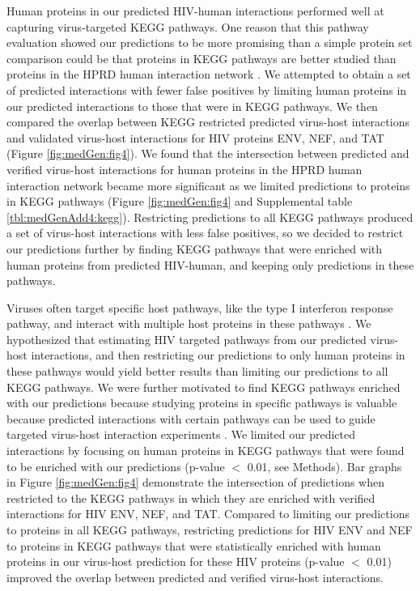 

Human proteins in our predicted HIV-human interactions performed well
at capturing virus-targeted KEGG pathways. One reason that this
pathway evaluation showed our predictions to be more promising than a
simple protein set comparison could be that proteins in KEGG pathways
are better studied than proteins in the HPRD human interaction network
\cite{kanehisa08}. We attempted to obtain a set of predicted
interactions with fewer false positives by limiting human proteins in
our predicted interactions to those that were in KEGG pathways. We
then compared the overlap between KEGG restricted predicted virus-host
interactions and validated virus-host interactions for HIV proteins
ENV, NEF, and TAT (Figure \ref{fig:medGen:fig4}). We found that the
intersection between predicted and verified virus-host interactions
for human proteins in the HPRD human interaction network became more
significant as we limited predictions to proteins in KEGG pathways
(Figure \ref{fig:medGen:fig4} and Supplemental table
\ref{tbl:medGenAdd4:kegg}). Restricting predictions to all KEGG
pathways produced a set of virus-host interactions with less false
positives, so we decided to restrict our predictions further by
finding KEGG pathways that were enriched with human proteins from
predicted HIV-human, and keeping only predictions in these pathways.

Viruses often target specific host pathways, like the type I
interferon response pathway, and interact with multiple host proteins
in these pathways \cite{navratil-system,yeung09}. We hypothesized that
estimating HIV targeted pathways from our predicted virus-host
interactions, and then restricting our predictions to only human
proteins in these pathways would yield better results than limiting
our predictions to all KEGG pathways. We were further motivated to
find KEGG pathways enriched with our predictions because studying
proteins in specific pathways is valuable because predicted
interactions with certain pathways can be used to guide targeted
virus-host interaction experiments \cite{lee2004probabilistic}. We
limited our predicted interactions by focusing on human proteins in
KEGG pathways that were found to be enriched with our predictions
(p-value $<$ 0.01, see Methods). Bar graphs in Figure
\ref{fig:medGen:fig4} demonstrate the intersection of predictions when
restricted to the KEGG pathways in which they are enriched with
verified interactions for HIV ENV, NEF, and TAT. Compared to limiting
our predictions to proteins in all KEGG pathways, restricting
predictions for HIV ENV and NEF to proteins in KEGG pathways that were
statistically enriched with human proteins in our virus-host
prediction for these HIV proteins (p-value $<$ 0.01) improved the
overlap between predicted and verified virus-host interactions.


